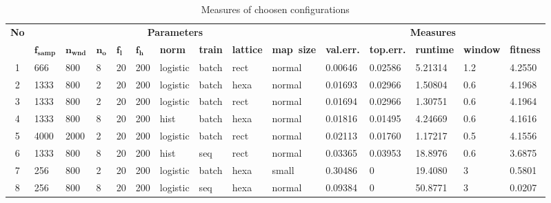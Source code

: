 \documentclass[a4paper]{IEEEtran}
\begin{document}
\begin{table}[!h]
\caption{Measures of choosen configurations}
	\begin{tabular}{|c||p{8mm}|p{8mm}|p{4mm}|p{4mm}|m{5mm} |p{8.5mm}|p{7mm}|p{8mm}|p{11mm} ||p{10mm}|p{10mm}|p{10mm}|p{10mm}|p{10mm}|}
		\hline
			\multirow{2}{*}{\textbf{No}} & 
			\multicolumn{9}{c||}{\textbf{Parameters}} & 
			\multicolumn{5}{c|}{\textbf{Measures}} \\
		\cline{2-15}
			&
			$ \mathbf{f_{samp}} $& 
			$ \mathbf{n_{wnd}} $& 
			$ \mathbf{n_o} $&
			$ \mathbf{f_l} $&
			$ \mathbf{f_h} $& 
			\textbf{norm}&
			\textbf{train}&
			\textbf{lattice} &
			\textbf{map~size} &
			\textbf{val.err.}&
			\textbf{top.err.}&
			\textbf{runtime}&
			\textbf{window}& 
			\textbf{fitness}\\
		\hline\hline
1 & 666 & 800 & 8 & 20 & 200 & logistic & batch & rect & normal & 0.00646 &  0.02586 &  5.21314 &  1.2 & 4.2550 \\ \hline
2 & 1333 & 800 & 2 & 20 & 200 & logistic & batch & hexa & normal &  0.01693 &  0.02966 &  1.50804 &  0.6 & 4.1968 \\ \hline
3 & 1333 & 800 & 2 & 20 & 200 & logistic & batch & rect & normal &  0.01694 &  0.02966 &  1.30751 &  0.6 & 4.1964 \\ \hline
4 & 1333 & 800 & 8 & 20 & 200 & hist & batch & hexa & normal &  0.01816 &  0.01495 &  4.24669 &  0.6 & 4.1616 \\ \hline
5 & 4000 & 2000 & 2 & 20 & 200 & logistic & batch & rect & normal &  0.02113 & 0.01760 &  1.17217 &  0.5 & 4.1556 \\ \hline
6 & 1333 & 800 & 8 & 20 & 200 & hist & seq & rect & normal & 0.03365 & 0.03953 & 18.8976 & 0.6 & 3.6875 \\ \hline
7 & 256 & 800 & 2 & 20 & 200 & logistic & batch & hexa & small &   0.30486 &    0 &   19.4080 &    3 &  0.5801 \\ \hline
8 & 256 & 800 & 8 & 20 & 200 & logistic & seq & hexa & normal & 0.09384 & 0 & 50.8771 & 3 & 0.0207 \\ \hline
	\end{tabular}
	\label{tbl:somresults}
\end{table}
\end{document}
